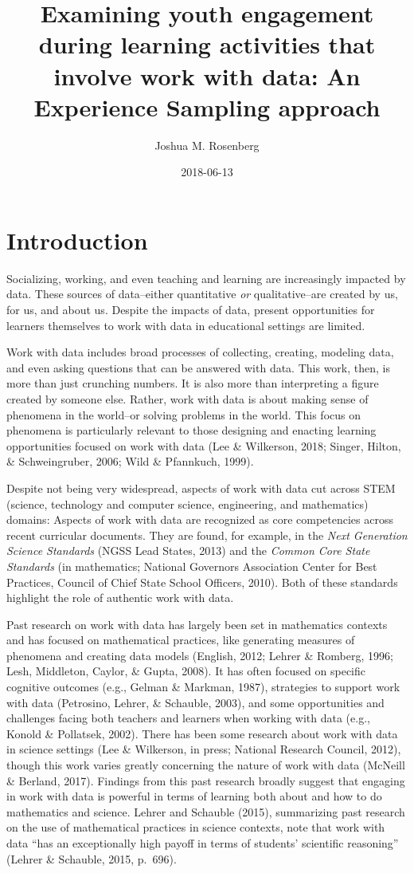 \documentclass[]{book}
\title{Examining youth engagement during learning activities that involve work
with data: An Experience Sampling approach}
\author{Joshua M. Rosenberg}
\date{2018-06-13}
\theoremstyle{definition}
\theoremstyle{definition}
\theoremstyle{definition}
\theoremstyle{remark}
\begin{document}
\maketitle

{
\setcounter{tocdepth}{1}
\tableofcontents
}
\chapter{Introduction}\label{intro-placemarker}

Socializing, working, and even teaching and learning are increasingly
impacted by data. These sources of data--either quantitative \emph{or}
qualitative--are created by us, for us, and about us. Despite the
impacts of data, present opportunities for learners themselves to work
with data in educational settings are limited.

Work with data includes broad processes of collecting, creating,
modeling data, and even asking questions that can be answered with data.
This work, then, is more than just crunching numbers. It is also more
than interpreting a figure created by someone else. Rather, work with
data is about making sense of phenomena in the world--or solving
problems in the world. This focus on phenomena is particularly relevant
to those designing and enacting learning opportunities focused on work
with data (Lee \& Wilkerson, 2018; Singer, Hilton, \& Schweingruber,
2006; Wild \& Pfannkuch, 1999).

Despite not being very widespread, aspects of work with data cut across
STEM (science, technology and computer science, engineering, and
mathematics) domains: Aspects of work with data are recognized as core
competencies across recent curricular documents. They are found, for
example, in the \emph{Next Generation Science Standards} (NGSS Lead
States, 2013) and the \emph{Common Core State Standards} (in
mathematics; National Governors Association Center for Best Practices,
Council of Chief State School Officers, 2010). Both of these standards
highlight the role of authentic work with data.

Past research on work with data has largely been set in mathematics
contexts and has focused on mathematical practices, like generating
measures of phenomena and creating data models (English, 2012; Lehrer \&
Romberg, 1996; Lesh, Middleton, Caylor, \& Gupta, 2008). It has often
focused on specific cognitive outcomes (e.g., Gelman \& Markman, 1987),
strategies to support work with data (Petrosino, Lehrer, \& Schauble,
2003), and some opportunities and challenges facing both teachers and
learners when working with data (e.g., Konold \& Pollatsek, 2002). There
has been some research about work with data in science settings (Lee \&
Wilkerson, in press; National Research Council, 2012), though this work
varies greatly concerning the nature of work with data (McNeill \&
Berland, 2017). Findings from this past research broadly suggest that
engaging in work with data is powerful in terms of learning both about
and how to do mathematics and science. Lehrer and Schauble (2015),
summarizing past research on the use of mathematical practices in
science contexts, note that work with data ``has an exceptionally high
payoff in terms of students' scientific reasoning'' (Lehrer \& Schauble,
2015, p.~696).
\end{document}
